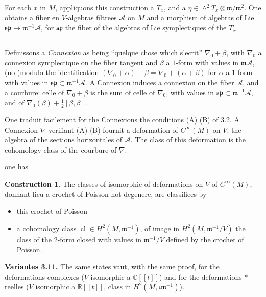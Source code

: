 \documentclass[11pt,a4paper]{article}
\theoremstyle{plain}
\theoremstyle{definition}
\newtheorem{construction}[theorem]{Construction}
\DeclareMathOperator{\cl}{cl}
\newcommand{\R}{\mathbb{R}}
\newcommand{\C}{\mathbb{C}}
\begin{document}
For each $x$ in $M$, appliquons this construction a $T_{x}$, and a $\eta \in \wedge^{2} T_{x} \otimes \mathfrak{m}/\mathfrak{m}^{2}$. One obtains a fiber en $V$-algebras filtrees $\mathcal{A}$ on $M$ and a morphism of algebras of Lie $\mathfrak{sp} \to \mathfrak{m}^{-1}\mathcal{A}$, for $\mathfrak{sp}$ the fiber of the algebras of Lie symplectiques of the $T_{x}$.

\subsection{}
Definissons a \emph{Connexion} as being ``quelque chose which s'ecrit'' $\nabla_{0} + \beta$,
with $\nabla_{0}$ a connexion symplectique on the fiber tangent and $\beta$ a $1$-form with values in $\mathfrak{m}\mathcal{A}$, (no-)modulo the identification $(\nabla_{0} + \alpha) + \beta = \nabla_{0} + (\alpha + \beta)$ for $\alpha$ a $1$-form with values in $\mathfrak{sp} \subset \mathfrak{m}^{-1}\mathcal{A}$. A Connexion induces a connexion on the fiber $\mathcal{A}$, and a courbure: celle of $\nabla_{0} + \beta$ is the sum of celle of $\nabla_{0}$, with values in $\mathfrak{sp} \subset \mathfrak{m}^{-1}\mathcal{A}$, and of $\nabla_{0}(\beta) + \frac{1}{2}[\beta,\beta]$.

One traduit facilement for the Connexions the conditions (A) (B) of 3.2. A Connexion $\nabla$ verifiant (A) (B) fournit a deformation of $C^{\infty}(M)$ on $V$: the algebra of the sections horizontales of $\mathcal{A}$. The class of this deformation is the cohomology class of the courbure of $\nabla$.

one has

\begin{construction}
The classes of isomorphie of deformations on $V$ of $C^{\infty}(M)$,
donnant lieu a crochet of Poisson not degenere, are classifiees by
\begin{itemize}
\item[(a)] this crochet of Poisson
\item[(b)] a cohomology class $\cl \in H^{2}(M, \mathfrak{m}^{-1})$, of image in $H^{2}(M, \mathfrak{m}^{-1}/V)$ the class of the $2$-form closed with values in $\mathfrak{m}^{-1}/V$ defined by the crochet of Poisson.
\end{itemize}
\end{construction}

\noindent \textbf{Variantes 3.11.} The same states vaut, with the same proof, for the deformations complexes ($V$ isomorphic a $\C[[t]]$) and for the deformations $*$-reelles ($V$ isomorphic a $\R[[t]]$, class in $H^{2}(M, i\mathfrak{m}^{-1})$).
\end{document}
